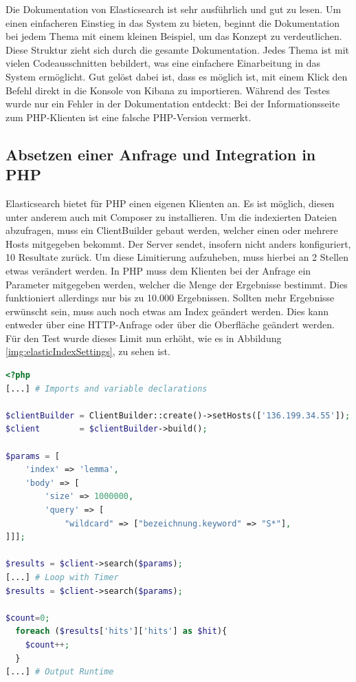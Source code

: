 Die Dokumentation von Elasticsearch ist sehr ausführlich und gut zu lesen. Um einen einfacheren Einstieg in das System zu bieten, beginnt die Dokumentation bei jedem Thema mit einem kleinen Beispiel, um das Konzept zu verdeutlichen. Diese Struktur zieht sich durch die gesamte Dokumentation. Jedes Thema ist mit vielen Codeausschnitten bebildert, was eine einfachere Einarbeitung in das System ermöglicht. 
Gut gelöst dabei ist, dass es möglich ist, mit einem Klick den Befehl direkt in die Konsole von Kibana zu importieren. Während des Testes wurde nur ein Fehler in der Dokumentation entdeckt: Bei der Informationsseite zum PHP-Klienten ist eine falsche PHP-Version vermerkt.

\subsection{Absetzen einer Anfrage und Integration in PHP}

Elasticsearch bietet für PHP einen eigenen Klienten an. Es ist möglich, diesen unter anderem auch mit Composer zu installieren. Um die indexierten Dateien abzufragen, muss ein ClientBuilder gebaut werden, welcher einen oder mehrere Hosts mitgegeben bekommt. Der Server sendet, insofern nicht anders konfiguriert, 10 Resultate zurück. Um diese Limitierung aufzuheben, muss hierbei an 2 Stellen etwas verändert werden. In PHP muss dem Klienten bei der Anfrage ein Parameter mitgegeben werden, welcher die Menge der Ergebnisse bestimmt. Dies funktioniert allerdings nur bis zu 10.000 Ergebnissen. Sollten mehr Ergebnisse erwünscht sein, muss auch noch etwas am Index geändert werden. Dies kann entweder über eine HTTP-Anfrage oder über die Oberfläche geändert werden. Für den Test wurde dieses Limit nun erhöht, wie es in Abbildung \ref{img:elasticIndexSettings}, zu sehen ist.


\begin{lstlisting}[language=php, frame=single, label={lst:phpElastic}, morekeywords={type,uninvertible,indexed,stored,field,multiValued, name}, caption=Abfrage in PHP an Elasticsearch,captionpos=b] 
<?php
[...] # Imports and variable declarations

$clientBuilder = ClientBuilder::create()->setHosts(['136.199.34.55']);
$client        = $clientBuilder->build();

$params = [
    'index' => 'lemma',
    'body' => [
        'size' => 1000000,
        'query' => [
            "wildcard" => ["bezeichnung.keyword" => "S*"],
]]];

$results = $client->search($params);
[...] # Loop with Timer  
$results = $client->search($params);

$count=0;
  foreach ($results['hits']['hits'] as $hit){
    $count++;
  }
[...] # Output Runtime
\end{lstlisting}

